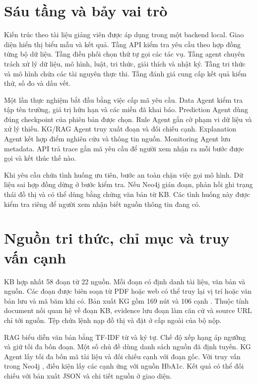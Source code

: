 
\section{Sáu tầng và bảy vai trò}
Kiến trúc theo tài liệu giảng viên \cite{architecture-v2} được áp dụng trong một backend local. Giao diện hiển thị biểu mẫu và kết quả. Tầng API kiểm tra yêu cầu theo hợp đồng từng bộ dữ liệu. Tầng điều phối chọn thứ tự gọi các tác vụ. Tầng agent chuyên trách xử lý dữ liệu, mô hình, luật, tri thức, giải thích và nhật ký. Tầng tri thức và mô hình chứa các tài nguyên thực thi. Tầng đánh giá cung cấp kết quả kiểm thử, số đo và dấu vết.



Một lần thực nghiệm bắt đầu bằng việc cấp mã yêu cầu. Data Agent kiểm tra tập tên trường, giá trị hữu hạn và các miền đã khai báo. Prediction Agent dùng đúng checkpoint của phiên bản được chọn. Rule Agent gắn cờ phạm vi dữ liệu và xử lý thiếu. KG/RAG Agent truy xuất đoạn và đối chiếu cạnh. Explanation Agent kết hợp điểm nghiên cứu và thông tin nguồn. Monitoring Agent lưu metadata. API trả trace gắn mã yêu cầu để người xem nhận ra mỗi bước được gọi và kết thúc thế nào.

Khi yêu cầu chứa tình huống ưu tiên, bước an toàn chặn việc gọi mô hình. Dữ liệu sai hợp đồng dừng ở bước kiểm tra. Nếu Neo4j gián đoạn, phản hồi ghi trạng thái đồ thị và có thể dùng bằng chứng văn bản từ KB. Các tình huống này được kiểm tra riêng để người xem nhận biết nguồn thông tin đang có.

\section{Nguồn tri thức, chỉ mục và truy vấn cạnh}
KB hợp nhất 58 đoạn từ 22 nguồn. Mỗi đoạn có định danh tài liệu, văn bản và nguồn. Các đoạn được biên soạn từ PDF hoặc web có thể truy lại vị trí hoặc văn bản lưu và mã băm khi có. Bản xuất KG gồm 169 nút  và 106 cạnh . Thuộc tính document nối quan hệ về đoạn KB, evidence lưu đoạn làm căn cứ và source URL chỉ tới nguồn. Tệp  chứa lệnh nạp đồ thị và đặt ở cấp ngoài của bộ nộp.



RAG biểu diễn văn bản bằng TF-IDF từ và ký tự. Chế độ xếp hạng áp ngưỡng và giữ tối đa bốn đoạn. Một số chủ đề dùng danh sách nguồn đã định tuyến. KG Agent lấy tối đa bốn mã tài liệu và đối chiếu cạnh với đoạn gốc. Với truy vấn trong Neo4j \cite{neo4j-v2}, điều kiện  lấy các cạnh ứng với nguồn HbA1c. Kết quả có thể đối chiếu với bản xuất JSON và chi tiết nguồn ở giao diện.

